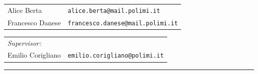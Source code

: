 \documentclass[
	a4paper,
]{CSMakotoTechnicalReport}
\begin{document}

\thispagestyle{empty}

\vspace*{0.05\textheight}

{\large\raggedright\reportdate\par}

\vspace{0.04\textheight}

{\fontsize{32pt}{34pt}\selectfont\raggedright\textbf{\reporttitle}\par}

\vspace{0.03\textheight}

{\Large\raggedright\textit{\textbf{\reportsubtitle}}\par}

\vspace{0.06\textheight}

{\large\raggedright
\begin{tabular}{@{}ll@{}}
	Alice Berta      & \texttt{alice.berta@mail.polimi.it} \\[2pt]
	Francesco Danese & \texttt{francesco.danese@mail.polimi.it} \\
\end{tabular}
\par}

\vspace{0.02\textheight}

{\normalsize\raggedright
\begin{tabular}{@{}ll@{}}
	\textit{Supervisor:} & \\[2pt]
	Emilio Corigliano    & \texttt{emilio.corigliano@polimi.it} \\
\end{tabular}
\par}

\vspace{0.06\textheight}

\hrule

\vspace{0.02\textheight}


\tableofcontents
\end{document}
